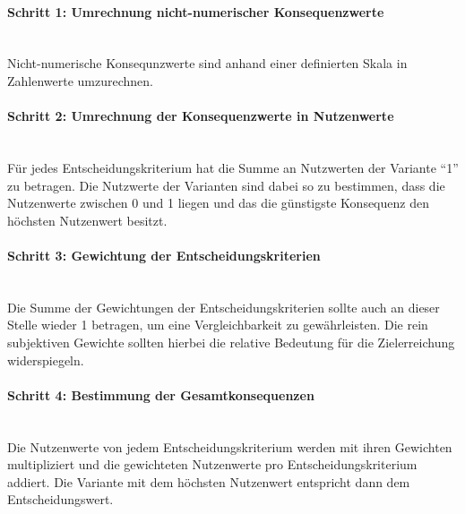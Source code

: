 \paragraph{Schritt 1: Umrechnung nicht-numerischer Konsequenzwerte}	\, \\
Nicht-numerische Konsequnzwerte sind anhand einer definierten Skala in Zahlenwerte umzurechnen.
\vspace*{-2.5mm}
\paragraph{Schritt 2: Umrechnung der Konsequenzwerte in Nutzenwerte} \, \\ 
Für jedes Entscheidungskriterium hat die Summe an Nutzwerten der Variante "`1"' zu betragen. Die Nutzwerte der Varianten sind dabei so zu bestimmen, dass die Nutzenwerte zwischen $0$ und 1 liegen und das die günstigste Konsequenz den höchsten Nutzenwert besitzt.
\vspace*{-2.5mm}
\paragraph{Schritt 3: Gewichtung der Entscheidungskriterien} \, \\
Die Summe der Gewichtungen der Entscheidungskriterien sollte auch an dieser Stelle wieder 1 betragen, um eine Vergleichbarkeit zu gewährleisten. Die rein subjektiven Gewichte sollten hierbei die relative Bedeutung für die Zielerreichung widerspiegeln.
\vspace*{-7.5mm}
\paragraph{Schritt 4: Bestimmung der Gesamtkonsequenzen} \, \\
Die Nutzenwerte von jedem Entscheidungskriterium werden mit ihren Gewichten multipliziert und die gewichteten Nutzenwerte pro Entscheidungskriterium addiert. Die Variante mit dem höchsten Nutzenwert entspricht dann dem Entscheidungswert.

 


